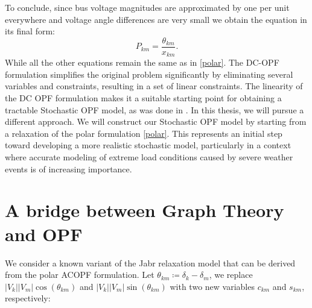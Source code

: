 \documentclass[11pt,a4paper,oneside,openany]{book}
\numberwithin{definition}{section}
\numberwithin{theorem}{section}
\numberwithin{problem}{section}
\begin{document}
To conclude, since bus voltage magnitudes are approximated by one per unit everywhere and voltage angle differences are very small we obtain the equation in its final form:
\begin{equation}
    P_{km} = \frac{\theta_{km}}{x_{km}}.
\end{equation}
While all the other equations remain the same as in \eqref{polar}. The DC-OPF formulation simplifies the original problem significantly by eliminating several variables and constraints, resulting in a set of linear constraints. The linearity of the DC OPF formulation makes it a suitable starting point for obtaining a tractable Stochastic OPF model, as was done in \cite{DBDRSOPF}. In this thesis, we will pursue a different approach. We will construct our Stochastic OPF model by starting from a relaxation of the polar formulation \eqref{polar}. This represents an initial step toward developing a more realistic stochastic model, particularly in a context where accurate modeling of extreme load conditions caused by severe weather events is of increasing importance.


\chapter{A bridge between Graph Theory and OPF}
\label{Graph results chapter}

We consider a known variant of the Jabr relaxation model \cite{jabr} that can be derived from the polar ACOPF formulation. Let $\theta_{km}\coloneqq \delta_k - \delta_m$, we replace $|V_k||V_m|\cos(\theta_{km})$ and $|V_k||V_m|\sin(\theta_{km})$ with two new variables $c_{km}$ and $s_{km}$, respectively:
\end{document}
